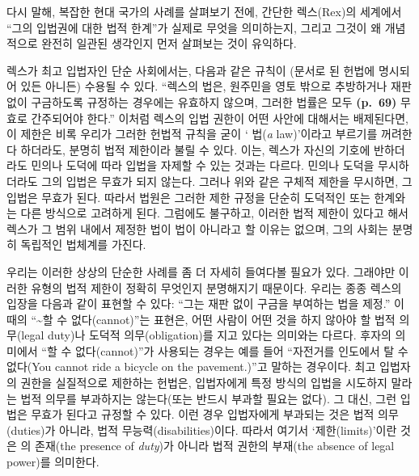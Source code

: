 다시 말해, 복잡한 현대 국가의 사례를 살펴보기 전에, 간단한 렉스(Rex)의
세계에서 ``그의 입법권에 대한 법적 한계''가 실제로 무엇을 의미하는지,
그리고 그것이 왜 개념적으로 완전히 일관된 생각인지 먼저 살펴보는 것이
유익하다.

렉스가 최고 입법자인 단순 사회에서는, 다음과 같은 규칙이 (문서로 된
헌법에 명시되어 있든 아니든) 수용될 수 있다. ``렉스의 법은, 원주민을
영토 밖으로 추방하거나 재판 없이 구금하도록 규정하는 경우에는 유효하지
않으며, 그러한 법률은 모두 \textbf{(p.~69)} 무효로 간주되어야 한다.''
이처럼 렉스의 입법 권한이 어떤 사안에 대해서는 배제된다면, 이 제한은
비록 우리가 그러한 헌법적 규칙을 굳이 ` 법(\emph{a}
law)'이라고 부르기를 꺼려한다 하더라도, 분명히 법적 제한이라 불릴 수
있다. 이는, 렉스가 자신의 기호에 반하더라도 민의나 도덕에 따라 입법을
자제할 수 있는 것과는 다르다. 민의나 도덕을 무시하더라도 그의 입법은
무효가 되지 않는다. 그러나 위와 같은 구체적 제한을 무시하면, 그 입법은
무효가 된다. 따라서 법원은 그러한 제한 규정을 단순히 도덕적인 또는
 한계와는 다른 방식으로 고려하게 된다. 그럼에도
불구하고, 이러한 법적 제한이 있다고 해서 렉스가 그 범위 내에서 제정한
법이 법이 아니라고 할 이유는 없으며, 그의 사회는 분명히 독립적인
법체계를 가진다.

우리는 이러한 상상의 단순한 사례를 좀 더 자세히 들여다볼 필요가 있다.
그래야만 이러한 유형의 법적 제한이 정확히 무엇인지 분명해지기 때문이다.
우리는 종종 렉스의 입장을 다음과 같이 표현할 수 있다: ``그는 재판 없이
구금을 부여하는 법을 제정.'' 이때의
``\textasciitilde 할 수 없다(cannot)''는 표현은, 어떤 사람이 어떤 것을
하지 않아야 할 법적 의무(legal duty)나 도덕적 의무(obligation)를 지고
있다는 의미와는 다르다. 후자의 의미에서 ``할 수 없다(cannot)''가
사용되는 경우는 예를 들어 ``자전거를 인도에서 탈 수 없다(You cannot ride
a bicycle on the pavement.)''고 말하는 경우이다. 최고 입법자의 권한을
실질적으로 제한하는 헌법은, 입법자에게 특정 방식의 입법을 시도하지
말라는 법적 의무를 부과하지는 않는다(또는 반드시 부과할 필요는 없다). 그
대신, 그런 입법은 무효가 된다고 규정할 수 있다. 이런 경우 입법자에게
부과되는 것은 법적 의무(duties)가 아니라, 법적 무능력(disabilities)이다.
따라서 여기서 `제한(limits)'이란 것은 의 존재(the presence of
\emph{duty})가 아니라 법적 권한의 부재(the absence of legal power)를
의미한다.

